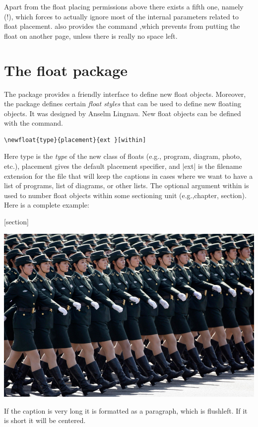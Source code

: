 Apart from the float placing permissions above there exists a fifth one, namely (!), which
forces \latex to actually ignore most of the internal parameters related to float placement.
\latex also provides the command ,which prevents \latex from putting the float on another page, unless there is really no space left.


\section{The float package}

The  package provides a friendly interface to define new float objects. Moreover, the package
defines certain \emph{float styles} that can be used to define new floating objects.  It
was designed by Anselm Lingnau. New float objects can be defined with the command.

\begin{verbatim}
\newfloat{type}{placement}{ext }[within]
\end{verbatim}



Here type is the \emph{type}  of the new class of floats (e.g., program, diagram, photo, etc.),
placement gives the default placement specifier, and |ext| is the filename extension
for the file that will keep the captions in cases where we want to have a list of programs,
list of diagrams, or other lists. The optional argument within is used to number float
objects within some sectioning unit (e.g.,chapter, section). Here is a complete example:

\begin{teXXX}
[section]
\end{teXXX}





\begin{Photo}
 \centering
 \includegraphics[width=0.80\linewidth]{./images/china-05.jpg}
\caption[a short caption]{If the caption is very long it is formatted as a paragraph, which is flushleft. If it is short it will be centered. }
\end{Photo}


